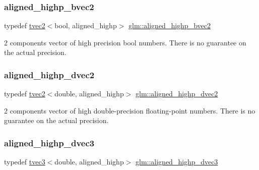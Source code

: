 \subsubsection{\texorpdfstring{aligned\+\_\+highp\+\_\+bvec2}{aligned\_highp\_bvec2}}
{\footnotesize\ttfamily typedef \hyperlink{structglm_1_1tvec2}{tvec2}$<$bool, aligned\+\_\+highp$>$ \hyperlink{group__gtc__type__aligned_ga0864e6acd440d07a7eff815da8990467}{glm\+::aligned\+\_\+highp\+\_\+bvec2}}

2 components vector of high precision bool numbers. There is no guarantee on the actual precision. \mbox{\label{group__gtc__type__aligned_gaaaaceecde7bb178eebc873836c7e6009}} 
\subsubsection{\texorpdfstring{aligned\+\_\+highp\+\_\+dvec2}{aligned\_highp\_dvec2}}
{\footnotesize\ttfamily typedef \hyperlink{structglm_1_1tvec2}{tvec2}$<$double, aligned\+\_\+highp$>$ \hyperlink{group__gtc__type__aligned_gaaaaceecde7bb178eebc873836c7e6009}{glm\+::aligned\+\_\+highp\+\_\+dvec2}}

2 components vector of high double-\/precision floating-\/point numbers. There is no guarantee on the actual precision. \mbox{\label{group__gtc__type__aligned_ga8f0cf063fb87e4bd3a26ec242a71d75d}} 
\subsubsection{\texorpdfstring{aligned\+\_\+highp\+\_\+dvec3}{aligned\_highp\_dvec3}}
{\footnotesize\ttfamily typedef \hyperlink{structglm_1_1tvec3}{tvec3}$<$double, aligned\+\_\+highp$>$ \hyperlink{group__gtc__type__aligned_ga8f0cf063fb87e4bd3a26ec242a71d75d}{glm\+::aligned\+\_\+highp\+\_\+dvec3}}

